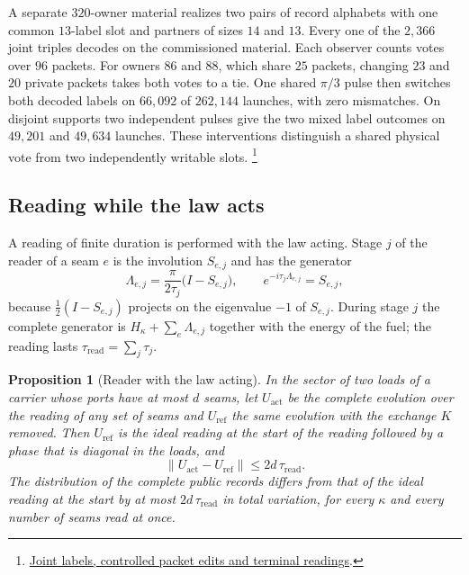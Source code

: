 \documentclass[11pt]{article}
\newtheorem{proposition}[theorem]{Proposition}
\theoremstyle{definition}
\theoremstyle{remark}
\theoremstyle{plain}
\begin{document}
A separate $320$-owner material realizes two pairs of record
alphabets with one common $13$-label slot and partners of sizes $14$
and $13$. Every one of the $2{,}366$ joint triples decodes on the
commissioned material. Each observer counts votes over $96$ packets.
For owners $86$ and $88$, which share $25$ packets, changing $23$ and
$20$ private packets takes both votes to a tie. One shared
$\pi/3$ pulse then switches both decoded labels on $66{,}092$ of
$262{,}144$ launches, with zero mismatches. On disjoint supports two
independent pulses give the two mixed label outcomes on $49{,}201$ and
$49{,}634$ launches. These interventions distinguish a shared physical
vote from two independently writable slots.%
\footnote{\href{https://github.com/FloatingPragma/observer-patch-holography/tree/main/model/experiments/interval_echo_consensus/local_interface/modal_slots/shared_vote}{Joint labels, controlled packet edits and terminal readings}.}

\subsection{Reading while the law acts}

A reading of finite duration is performed with the law acting. Stage $j$ of
the reader of a seam $e$ is the involution $S_{e,j}$ and has the generator
\[
\Lambda_{e,j}=\frac{\pi}{2\tau_j}\bigl(I-S_{e,j}\bigr),\qquad
e^{-i\tau_j\Lambda_{e,j}}=S_{e,j},
\]
because $\tfrac12(I-S_{e,j})$ projects on the eigenvalue $-1$ of $S_{e,j}$.
During stage $j$ the complete generator is
$H_\kappa+\sum_e\Lambda_{e,j}$ together with the energy of the fuel; the
reading lasts $\tau_{\mathrm{read}}=\sum_j\tau_j$.

\begin{proposition}[Reader with the law acting]
\label{prop:reader}
In the sector of two loads of a carrier whose ports have at most $d$ seams,
let $U_{\mathrm{act}}$ be the complete evolution over the reading of any
set of seams and $U_{\mathrm{ref}}$ the same evolution with the exchange
$K$ removed. Then $U_{\mathrm{ref}}$ is the ideal reading at the start of
the reading followed by a phase that is diagonal in the loads, and
\[
\lVert U_{\mathrm{act}}-U_{\mathrm{ref}}\rVert\le2d\,\tau_{\mathrm{read}} .
\]
The distribution of the complete public records differs from that of the
ideal reading at the start by at most $2d\,\tau_{\mathrm{read}}$ in total
variation, for every $\kappa$ and every number of seams read at once.
\end{proposition}
\end{document}

